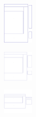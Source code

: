 \documentclass[portrait, a1paper, fontscale=0.5]{baposter}
\begin{document}
\begin{poster}
{\begin{center}
	\begin{minipage}{5em}
		\centering
		\includegraphics[width=4em]{optimization/variant_5.png}
	\end{minipage}
	\begin{minipage}{5em}
		\centering
		\includegraphics[width=4em]{optimization/variant_6.png}
	\end{minipage}
	\begin{minipage}{5em}
		\centering
		\includegraphics[width=4em]{optimization/variant_7.png}
	\end{minipage}
\end{center}

}
\end{poster}
\end{document}

